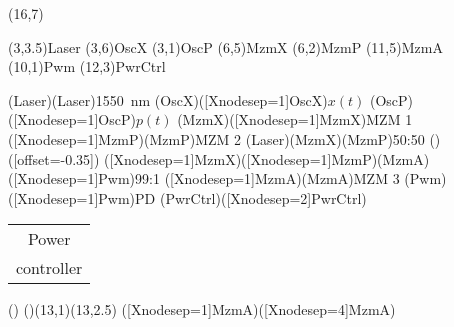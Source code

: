 \documentclass[pstricks]{standalone}
\begin{document}
	\begin{pspicture}(16,7)
		\begin{optexp}
			
		  	\pnode(3,3.5){Laser}
		  	\pnode(3,6){OscX}
		  	\pnode(3,1){OscP}
		  	\pnode(6,5){MzmX}
		  	\pnode(6,2){MzmP}
		  	\pnode(11,5){MzmA}
		  	\pnode(10,1){Pwm}
		  	\pnode(12,3){PwrCtrl}
		  	
			\optbox[position=start, optboxsize=2 1, labeloffset=0](Laser)(Laser){\SI{1550}{\nano\meter}}
			\elecsynthesizer[compname=OscX, wire=none, labelangle=-90](OscX)([Xnodesep=1]OscX){$x(t)$}
			\elecsynthesizer[compname=OscP, wire=none, labelangle=-90](OscP)([Xnodesep=1]OscP){$p(t)$}
			\optmzm[compname=MzmX, extnode=t](MzmX)([Xnodesep=1]MzmX){MZM 1}
			\optmzm[compname=MzmP, extnode=b]([Xnodesep=1]MzmP)(MzmP){MZM 2}
			\wdmsplitter[labeloffset=0.5](Laser)(MzmX)(MzmP){50:50}
			()
			([offset=-0.35])
			\optcoupler[labeloffset=0.5]([Xnodesep=1]MzmX)([Xnodesep=1]MzmP)(MzmA)([Xnodesep=1]Pwm){99:1}
			\optmzm[compname=MzmA, extnode=b]([Xnodesep=1]MzmA)(MzmA){MZM 3}
			\optdetector[compname=PD, extnode=r, dettype=diode](Pwm)([Xnodesep=1]Pwm){PD}
			\optbox[compname=PwrCtrl, labeloffset=0, optboxsize=2 1](PwrCtrl)([Xnodesep=2]PwrCtrl){\begin{tabular}{@{}c@{}}Power\\controller\end{tabular}}
			()
			\drawwire()(13,1)(13,2.5)
			\optfiber[addtoFiberOut={arrows=->}]([Xnodesep=1]MzmA)([Xnodesep=4]MzmA)
		\end{optexp}
	\end{pspicture}
\end{document}
